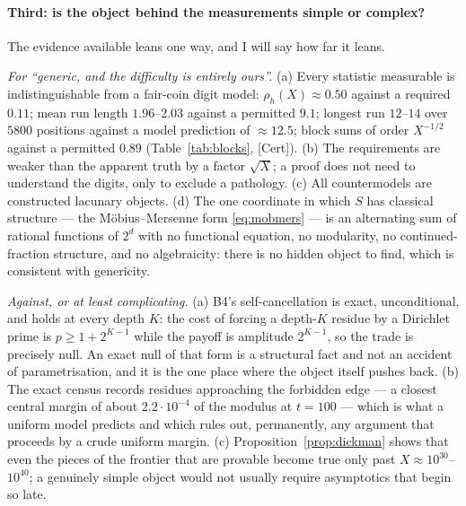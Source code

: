 \documentclass[11pt]{article}
\theoremstyle{plain}
\theoremstyle{definition}
\theoremstyle{remark}
\newcommand{\ev}[1]{{\small\textsf{[#1]}}\xspace}
\begin{document}
\paragraph{Third: is the object behind the measurements simple or complex?}
The evidence available leans one way, and I will say how far it leans.

\emph{For ``generic, and the difficulty is entirely ours''.} (a) Every
statistic measurable is indistinguishable from a fair-coin digit model:
$\rho_h(X)\approx0.50$ against a required $0.11$; mean run length
$1.96$--$2.03$ against a permitted $9.1$; longest run $12$--$14$ over $5800$
positions against a model prediction of $\approx12.5$; block sums of order
$X^{-1/2}$ against a permitted $0.89$ (Table~\ref{tab:blocks}, \ev{Cert}). (b) The
requirements are weaker than the apparent truth by a factor $\sqrt X$; a
proof does not need to understand the digits, only to exclude a pathology.
(c) All countermodels are constructed lacunary objects. (d) The one
coordinate in which $S$ has classical structure --- the M\"obius--Mersenne
form \eqref{eq:mobmers} --- is an alternating sum of rational functions of
$2^{d}$ with no functional equation, no modularity, no continued-fraction
structure, and no algebraicity: there is no hidden object to find, which is
consistent with genericity.

\emph{Against, or at least complicating.} (a) B4's self-cancellation is
exact, unconditional, and holds at every depth $K$: the cost of forcing a
depth-$K$ residue by a Dirichlet prime is $p\ge1+2^{K-1}$ while the payoff is
amplitude $2^{K-1}$, so the trade is precisely null. An exact null of that
form is a structural fact and not an accident of parametrisation, and it is
the one place where the object itself pushes back. (b) The exact census
records residues approaching the forbidden edge --- a closest central margin
of about $2.2\cdot10^{-4}$ of the modulus at $t=100$ --- which is what a
uniform model predicts and which rules out, permanently, any argument that
proceeds by a crude uniform margin. (c) Proposition~\ref{prop:dickman} shows
that even the pieces of the frontier that are provable become true only past
$X\approx10^{30}$--$10^{40}$; a genuinely simple object would not usually
require asymptotics that begin so late.
\end{document}
